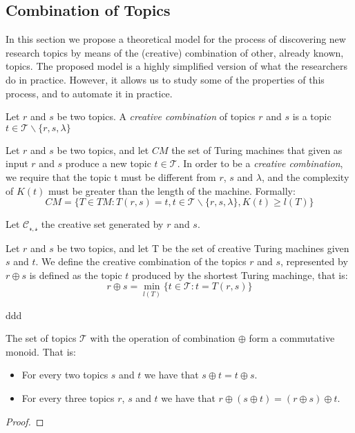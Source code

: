 \subsection{Combination of Topics}

In this section we propose a theoretical model for the process of discovering new research topics by means of the (creative) combination of other, already known, topics. The proposed model is a highly simplified version of what the researchers do in practice. However, it allows us to study some of the properties of this process, and to automate it in practice.

\begin{definition}
Let $r$ and $s$ be two topics. A \emph{creative combination} of topics $r$ and $s$ is a topic $t \in \mathcal{T} \backslash \{r, s, \lambda\}$
\end{definition}

Let $r$ and $s$ be two topics, and let $CM$ the set of Turing machines that given as input $r$ and $s$ produce a new topic $t \in \mathcal{T}$. In order to be a \emph{creative combination}, we require that the topic t must be different from $r$, $s$ and $\lambda$, and the complexity of $K(t)$ must be greater than the length of the machine. Formally:
\[
CM = \{ T \in TM : T(r, s) = t, t \in \mathcal{T} \backslash \{r, s, \lambda\}, K(t) \geq l(T) \}
\]

Let $\mathcal{C_{r,s}}$ the creative set generated by $r$ and $s$.


\begin{definition}

\end{definition}



\begin{definition}
Let $r$ and $s$ be two topics, and let T be the set of creative Turing machines given $s$ and $t$. We define the creative combination of the topics $r$ and $s$, represented by $r \oplus s$ is defined as the topic $t$ produced by the shortest Turing machinge, that is:
\[
r \oplus s = \min_{l(T)} \{ t \in \mathcal{T} : t = T(r,s) \}
\]
\end{definition}

ddd

\begin{proposition}
The set of topics $\mathcal{T}$ with the operation of combination $\oplus$ form a commutative monoid. That is:
\begin{itemize}
\item For every two topics $s$ and $t$ we have that $s \oplus t = t \oplus s$.
\item  For every three topics $r$, $s$ and $t$ we have that $r \oplus \left( s \oplus t \right) = \left( r \oplus s \right) \oplus t$.
\end{itemize}
\end{proposition}
\begin{proof}
\end{proof}

